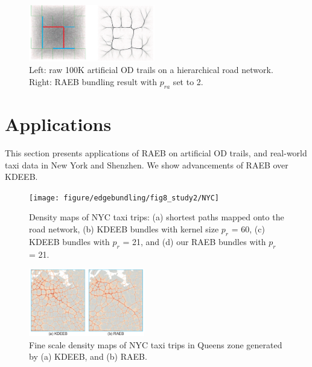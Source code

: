 \begin{figure}[t]
	\centering
	\includegraphics[width=0.49\textwidth]{figure/edgebundling/fig7_hierar/artifical}
	\vspace{-6mm}
	\caption{
		Left: raw 100K artificial OD trails on a hierarchical road network.
		Right: RAEB bundling result with $p_{ra}$ set to 2.
		}
	\label{fig:hier}
	\vspace{-5mm}
\end{figure}

\section{Applications}
This section presents applications of RAEB on artificial OD trails, and real-world taxi data in New York and Shenzhen.
We show advancements of RAEB over KDEEB.

\begin{figure}[t]
	\centering
	\texttt{[image: figure/edgebundling/fig8\_study2/NYC]}
	\vspace{-2mm}
	\caption{Density maps of NYC taxi trips:
	(a) shortest paths mapped onto the road network, 
	(b) KDEEB bundles with kernel size $p_r$ = 60,
	(c) KDEEB bundles with $p_r$ = 21,
	and (d) our RAEB bundles with $p_r$ = 21.}
	\label{fig:nyc_visual}
	\vspace{-4mm}
\end{figure}

\begin{figure}[t]
	\centering
	\includegraphics[width=0.45\textwidth]{figure/edgebundling/fig9_study2-2/NYC-zoom}
	\vspace{-3mm}
	\caption{Fine scale density maps of NYC taxi trips in Queens zone generated by (a) KDEEB, and (b) RAEB.}
	\label{fig:nyc-zoom}
	\vspace{-4mm}
\end{figure}

